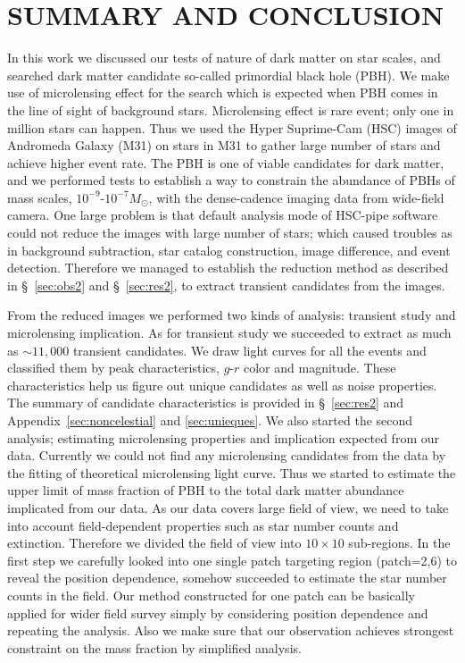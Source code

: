 \documentclass[iop, apj]{emulateapj}
\newcommand{\?}{\stackrel{?}{=}}
\begin{document}
\section{SUMMARY AND CONCLUSION}
\label{sec:dis2}
In this work we discussed our tests of nature of dark matter on star scales, and 
searched dark matter candidate so-called primordial black hole (PBH). 
We make use of microlensing effect for the search 
which is expected when PBH comes in the line of sight of background stars. 
Microlensing effect is rare event; only one in million stars can happen. 
Thus we used the Hyper Suprime-Cam (HSC) images of Andromeda Galaxy (M31) 
on stars in M31 to gather large number of stars and achieve higher event rate.  
The PBH is one of viable candidates for dark matter, and 
we performed tests to establish a way to constrain 
the abundance of PBHs of mass scales, $10^{-9}$-$10^{-7}M_\odot$, 
with the dense-cadence imaging data from wide-field camera.
One large problem is that 
default analysis mode of HSC-pipe software could not reduce the images with large number of stars; 
which caused troubles as in background subtraction, star catalog construction, 
image difference, and event detection. 
Therefore we managed to establish 
the reduction method as described in \S~\ref{sec:obs2} and \S~\ref{sec:res2}, to extract transient candidates from the images. 

From the reduced images we performed two kinds of analysis: 
transient study and microlensing implication. 
As for transient study we succeeded to extract as much as $\sim11,000$ transient candidates. 
We draw light curves for all the events and classified them 
by peak characteristics, $g$-$r$ color and magnitude. 
These characteristics help us figure out unique candidates  
as well as noise properties. 
The summary of candidate characteristics is provided 
in \S~\ref{sec:res2} and Appendix~\ref{sec:noncelestial} and \ref{sec:unieques}. 
We also started the second analysis; estimating microlensing properties and implication expected from our data.
Currently we could not find any microlensing candidates from the data 
by the fitting of theoretical microlensing light curve. 
Thus we started to estimate the upper limit of mass fraction of PBH to the total dark matter abundance implicated from our data. 
As our data covers large field of view, we need to take into account field-dependent properties 
such as star number counts and extinction. 
Therefore we divided the field of view into $10\times10$ sub-regions.  
In the first step we carefully looked into one single 
patch targeting region (patch=2,6) to reveal the position dependence, 
somehow succeeded to estimate the star number counts in the field.   
Our method constructed for one patch can be basically applied for wider field survey 
simply by considering position dependence and repeating the analysis. 
Also we make sure that our observation achieves 
strongest constraint on the mass fraction by simplified analysis. 
\end{document}
